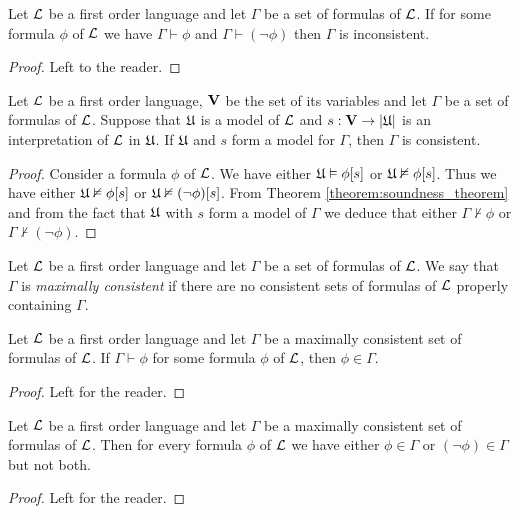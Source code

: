 \begin{proposition}\label{proposition:form_of_excluded_middle_for_consistent}
Let ${\mathcal L}$ be a first order language and let $\Gamma$ be a set of formulas of ${\mathcal L}$. If for some formula $\phi$ of ${\mathcal L}$ we have $\Gamma \vdash \phi$ and $\Gamma \vdash (\neg \phi)$ then $\Gamma$ is inconsistent.
\end{proposition}
\begin{proof}
Left to the reader.
\end{proof}

\begin{proposition}
Let ${\mathcal L}$ be a first order language, $\mathbf{V}$ be the set of its variables and let $\Gamma$ be a set of formulas of ${\mathcal L}$. Suppose that ${\mathfrak U}$ is a model of ${\mathcal L}$ and $s:\mathbf{V}\rightarrow |{\mathfrak U}|$ is an interpretation of ${\mathcal L}$ in ${\mathfrak U}$. If ${\mathfrak U}$ and $s$ form a model for $\Gamma$, then $\Gamma$ is consistent.
\end{proposition}
\begin{proof}
Consider a formula $\phi$ of ${\mathcal L}$. We have either ${\mathfrak U} \vDash \phi[s]$ or ${\mathfrak U} \nvDash \phi[s]$. Thus we have either ${\mathfrak U} \nvDash \phi[s]$ or ${\mathfrak U} \nvDash (\neg \phi)[s]$. From Theorem \ref{theorem:soundness_theorem} and from the fact that ${\mathfrak U}$ with $s$ form a model of $\Gamma$ we deduce that either $\Gamma \nvdash \phi$ or $\Gamma \nvdash (\neg \phi)$.
\end{proof}

\begin{definition}
Let ${\mathcal L}$ be a first order language and let $\Gamma$ be a set of formulas of ${\mathcal L}$. We say that $\Gamma$ is \textit{maximally consistent} if there are no consistent sets of formulas of ${\mathcal L}$ properly containing $\Gamma$.
\end{definition}

\begin{proposition}
Let ${\mathcal L}$ be a first order language and let $\Gamma$ be a maximally consistent set of formulas of ${\mathcal L}$. If $\Gamma \vdash \phi$ for some formula $\phi$ of ${\mathcal L}$, then $\phi \in \Gamma$.
\end{proposition}
\begin{proof}
Left for the reader.
\end{proof}

\begin{proposition}
Let ${\mathcal L}$ be a first order language and let $\Gamma$ be a maximally consistent set of formulas of ${\mathcal L}$. Then for every formula $\phi$ of ${\mathcal L}$ we have either $\phi \in \Gamma$ or $(\neg \phi)\in \Gamma$ but not both.
\end{proposition}
\begin{proof}
Left for the reader.
\end{proof}

